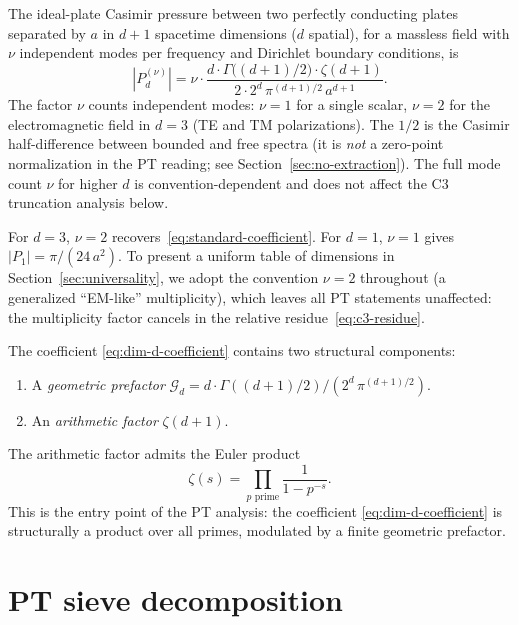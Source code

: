 \documentclass[11pt,a4paper]{article}
\begin{document}
The ideal-plate Casimir pressure between two perfectly conducting plates separated by $a$ in
$d+1$ spacetime dimensions ($d$ spatial), for a massless field with $\nu$ independent modes per
frequency and Dirichlet boundary conditions, is~\cite{Mostepanenko2009,Klimchitskaya2009}
\begin{equation}
|P_{d}^{(\nu)}| = \nu \cdot \frac{d \cdot \Gamma\bigl((d+1)/2\bigr) \cdot \zeta(d+1)}{2 \cdot 2^{d}\,\pi^{(d+1)/2}\,a^{d+1}}.
\label{eq:dim-d-coefficient}
\end{equation}
The factor $\nu$ counts independent modes: $\nu = 1$ for a single scalar, $\nu = 2$ for the
electromagnetic field in $d = 3$ (TE and TM polarizations). The $1/2$ is the Casimir half-difference
between bounded and free spectra (it is \emph{not} a zero-point normalization in the PT reading; see
Section~\ref{sec:no-extraction}). The full mode count $\nu$ for higher $d$ is convention-dependent
and does not affect the C3 truncation analysis below.

For $d = 3$, $\nu = 2$ recovers~\eqref{eq:standard-coefficient}. For $d = 1$, $\nu = 1$ gives
$|P_1| = \pi/(24\,a^2)$. To present a uniform table of dimensions in
Section~\ref{sec:universality}, we adopt the convention $\nu = 2$ throughout (a generalized
``EM-like'' multiplicity), which leaves all PT statements unaffected: the multiplicity factor
cancels in the relative residue~\eqref{eq:c3-residue}.

The coefficient \eqref{eq:dim-d-coefficient} contains two structural components:
\begin{enumerate}
  \item A \emph{geometric prefactor}
  $\mathcal{G}_{d} = d \cdot \Gamma((d+1)/2) / (2^{d}\,\pi^{(d+1)/2})$.
  \item An \emph{arithmetic factor} $\zeta(d+1)$.
\end{enumerate}

The arithmetic factor admits the Euler product
\begin{equation}
\zeta(s) = \prod_{p \text{ prime}} \frac{1}{1 - p^{-s}}.
\label{eq:euler-product}
\end{equation}
This is the entry point of the PT analysis: the coefficient \eqref{eq:dim-d-coefficient} is
structurally a product over all primes, modulated by a finite geometric prefactor.

\section{PT sieve decomposition}
\label{sec:pt-decomposition}
\end{document}
